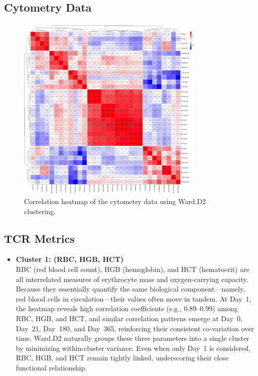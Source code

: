 \documentclass[12pt,a4paper]{report}
\begin{document}
\subsection{Cytometry Data}

\begin{figure}[H]
  \centering
  \includegraphics[width=0.8\textwidth]{images/Cytometry_euclidean_distance.png}
  \caption{Correlation heatmap of the cytometry data using Ward.D2 clustering.}
  \label{fig:cytometry_heatmap}
\end{figure}
\subsection{TCR Metrics}
\noindent

\begin{itemize}
  \item \textbf{Cluster 1: (RBC, HGB, HCT)} \\
  RBC (red blood cell count), HGB (hemoglobin), and HCT (hematocrit) are all interrelated measures of erythrocyte mass and oxygen-carrying capacity. Because they essentially quantify the same biological component—namely, red blood cells in circulation—their values often move in tandem. At Day~1, the heatmap reveals high correlation coefficients (e.g., 0.89--0.99) among RBC, HGB, and HCT, and similar correlation patterns emerge at Day~0, Day~21, Day~180, and Day~365, reinforcing their consistent co-variation over time. Ward.D2 naturally groups  these three parameters into a single cluster by minimizing within-cluster variance. Even when only Day~1 is considered, RBC, HGB, and HCT remain tightly linked, underscoring their close functional relationship.
\end{itemize}
\end{document}
